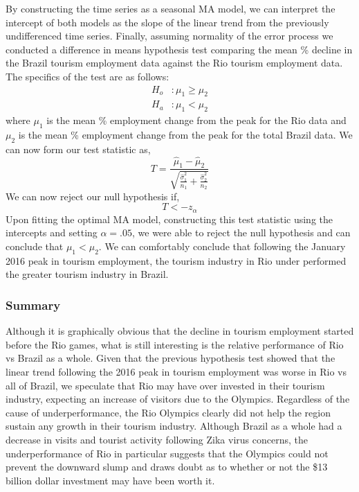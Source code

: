 \documentclass[11pt, twocolumn]{article}
\begin{document}
\begin{enumerate}
    
  By constructing the time series as a seasonal MA model, we can interpret the intercept of both models as the slope of the linear trend from the previously undifferenced time series. Finally, assuming normality of the error process we conducted a difference in means hypothesis test comparing the mean \% decline in the Brazil tourism employment data against the Rio tourism employment data. The specifics of the test are as follows:
    \begin{align*}
        H_o&: \mu_1 \geq \mu_2\\
        H_a&: \mu_1 < \mu_2
    \end{align*}
    where $\mu_1$ is the mean \% employment change from the peak for the Rio data and $\mu_2$ is the mean \% employment change from the peak for the total Brazil data.  We can now form our test statistic as,
    \[T = \frac{\hat{\mu}_{1} - \hat{\mu}_{2}}{\sqrt{\frac{\hat{\sigma}_{1}^{2}}{n_1}+\frac{\hat{\sigma}_{2}^{2}}{n_2}}}\]
    We can now reject our null hypothesis if,
    \[T < -z_{\alpha}\]
    Upon fitting the optimal MA model, constructing this test statistic using the intercepts and setting $\alpha = .05$, we were able to reject the null hypothesis and can conclude that $\mu_1 < \mu_2$. We can comfortably conclude that following the January 2016 peak in tourism employment, the tourism industry in Rio under performed the greater tourism industry in Brazil.
    
\end{enumerate}

    
\subsubsection{Summary}
    
    Although it is graphically obvious that the decline in tourism employment started before the Rio games, what is still interesting is the relative performance of Rio vs Brazil as a whole. Given that the previous hypothesis test showed that the linear trend following the 2016 peak in tourism employment was worse in Rio vs all of Brazil, we speculate that Rio may have over invested in their tourism industry, expecting an increase of visitors due to the Olympics. Regardless of the cause of underperformance, the Rio Olympics clearly did not help the region sustain any growth in their tourism industry. Although Brazil as a whole had a decrease in visits and tourist activity following Zika virus concerns, the underperformance of Rio in particular suggests that the Olympics could not prevent the downward slump and draws doubt as to whether or not the \$13 billion dollar investment may have been worth it.
\end{document}
